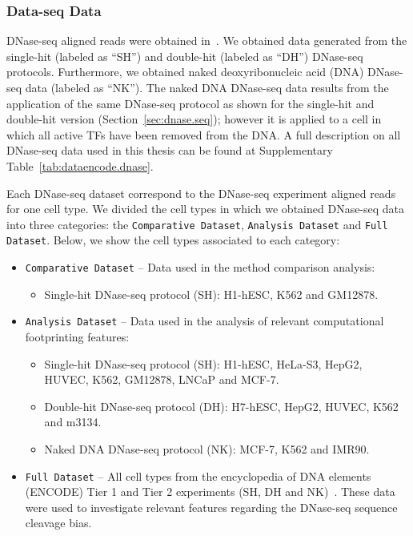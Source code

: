 \subsubsection{Data-seq Data}

DNase-seq aligned reads were obtained in~\cite{encode2012}. We obtained data generated from the single-hit (labeled as ``SH'') and double-hit (labeled as ``DH'') DNase-seq protocols. Furthermore, we obtained naked deoxyribonucleic acid (DNA) DNase-seq data (labeled as ``NK''). The naked DNA DNase-seq data results from the application of the same DNase-seq protocol as shown for the single-hit and double-hit version (Section~\ref{sec:dnase.seq}); however it is applied to a cell in which all active TFs have been removed from the DNA. A full description on all DNase-seq data used in this thesis can be found at Supplementary Table~\ref{tab:dataencode.dnase}.

Each DNase-seq dataset correspond to the DNase-seq experiment aligned reads for one cell type. We divided the cell types in which we obtained DNase-seq data into three categories: \linebreak the {\tt Comparative Dataset}, {\tt Analysis Dataset} and {\tt Full Dataset}. Below, we show the cell types associated to each category:

\begin{itemize}
\item {\tt Comparative Dataset} -- Data used in the method comparison analysis:
\begin{itemize}
\item Single-hit DNase-seq protocol (SH): H1-hESC, K562 and GM12878.
\end{itemize}
\item {\tt Analysis Dataset} -- Data used in the analysis of relevant computational footprinting features:
\begin{itemize}
\item Single-hit DNase-seq protocol (SH): H1-hESC, HeLa-S3, HepG2, HUVEC, K562, \linebreak GM12878, LNCaP and MCF-7.
\item Double-hit DNase-seq protocol (DH): H7-hESC, HepG2, HUVEC, K562 and m3134.
\item Naked DNA DNase-seq protocol (NK): MCF-7, K562 and IMR90.
\end{itemize}
\item {\tt Full Dataset} -- All cell types from the encyclopedia of DNA elements (ENCODE) Tier 1 and Tier 2 experiments (SH, DH and NK)~\citep{encode2012}. These data were used to investigate relevant features regarding the DNase-seq sequence cleavage bias.
\end{itemize}


